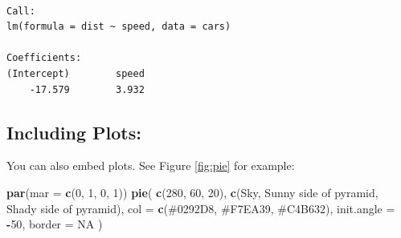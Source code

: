 \documentclass[
]{book}
\newenvironment{Shaded}{\begin{snugshade}}{\end{snugshade}}
\newcommand{\AttributeTok}[1]{\textcolor[rgb]{0.13,0.29,0.53}{#1}}
\newcommand{\ConstantTok}[1]{\textcolor[rgb]{0.56,0.35,0.01}{#1}}
\newcommand{\DecValTok}[1]{\textcolor[rgb]{0.00,0.00,0.81}{#1}}
\newcommand{\FunctionTok}[1]{\textcolor[rgb]{0.13,0.29,0.53}{\textbf{#1}}}
\newcommand{\NormalTok}[1]{#1}
\newcommand{\SpecialCharTok}[1]{\textcolor[rgb]{0.81,0.36,0.00}{\textbf{#1}}}
\newcommand{\StringTok}[1]{\textcolor[rgb]{0.31,0.60,0.02}{#1}}
\begin{document}
\begin{verbatim}

Call:
lm(formula = dist ~ speed, data = cars)

Coefficients:
(Intercept)        speed  
    -17.579        3.932  
\end{verbatim}

\hypertarget{including-plots}{%
\subsection{Including Plots:}\label{including-plots}}

You can also embed plots. See Figure \ref{fig:pie} for example:

\begin{Shaded}
\begin{Highlighting}[]
\FunctionTok{par}\NormalTok{(}\AttributeTok{mar =} \FunctionTok{c}\NormalTok{(}\DecValTok{0}\NormalTok{, }\DecValTok{1}\NormalTok{, }\DecValTok{0}\NormalTok{, }\DecValTok{1}\NormalTok{))}
\FunctionTok{pie}\NormalTok{(}
  \FunctionTok{c}\NormalTok{(}\DecValTok{280}\NormalTok{, }\DecValTok{60}\NormalTok{, }\DecValTok{20}\NormalTok{),}
  \FunctionTok{c}\NormalTok{(}\StringTok{\textquotesingle{}Sky\textquotesingle{}}\NormalTok{, }\StringTok{\textquotesingle{}Sunny side of pyramid\textquotesingle{}}\NormalTok{, }\StringTok{\textquotesingle{}Shady side of pyramid\textquotesingle{}}\NormalTok{),}
  \AttributeTok{col =} \FunctionTok{c}\NormalTok{(}\StringTok{\textquotesingle{}\#0292D8\textquotesingle{}}\NormalTok{, }\StringTok{\textquotesingle{}\#F7EA39\textquotesingle{}}\NormalTok{, }\StringTok{\textquotesingle{}\#C4B632\textquotesingle{}}\NormalTok{),}
  \AttributeTok{init.angle =} \SpecialCharTok{{-}}\DecValTok{50}\NormalTok{, }\AttributeTok{border =} \ConstantTok{NA}
\NormalTok{)}
\end{Highlighting}
\end{Shaded}
\end{document}
